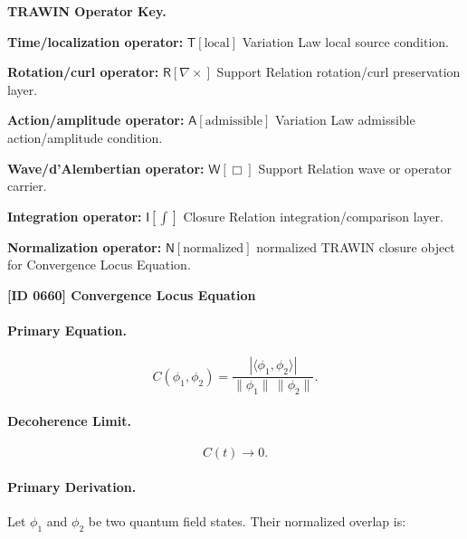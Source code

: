 \par\vspace{0.45\baselineskip}
\noindent\begin{minipage}[t]{\linewidth}
\begingroup
\small
\raggedright
\textbf{TRAWIN Operator Key.}\par
\noindent\textbf{Time/localization operator:} $\mathsf{T}\!\left[\mathrm{local}\right]$ Variation Law local source condition.\par
\noindent\textbf{Rotation/curl operator:} $\mathsf{R}\!\left[\nabla\times\right]$ Support Relation rotation/curl preservation layer.\par
\noindent\textbf{Action/amplitude operator:} $\mathsf{A}\!\left[\mathrm{admissible}\right]$ Variation Law admissible action/amplitude condition.\par
\noindent\textbf{Wave/d'Alembertian operator:} $\mathsf{W}\!\left[\Box\right]$ Support Relation wave or operator carrier.\par
\noindent\textbf{Integration operator:} $\mathsf{I}\!\left[\int\right]$ Closure Relation integration/comparison layer.\par
\noindent\textbf{Normalization operator:} $\mathsf{N}\!\left[\mathrm{normalized}\right]$ normalized TRAWIN closure object for Convergence Locus Equation.\par
\endgroup
\end{minipage}

\clearpage
\noindent\textbf{[ID 0660] Convergence Locus Equation}\par
\vspace{0.35em}
\paragraph{Primary Equation.}
\begin{equation}
C(\phi_1,\phi_2)
=
\frac{
|\langle \phi_1,\phi_2\rangle|
}{
\|\phi_1\|\,\|\phi_2\|
}.
\end{equation}

\paragraph{Decoherence Limit.}
\begin{equation}
C(t)\rightarrow 0 .
\end{equation}

\paragraph{Primary Derivation.}
Let $\phi_1$ and $\phi_2$ be two quantum field states.  
Their normalized overlap is:

